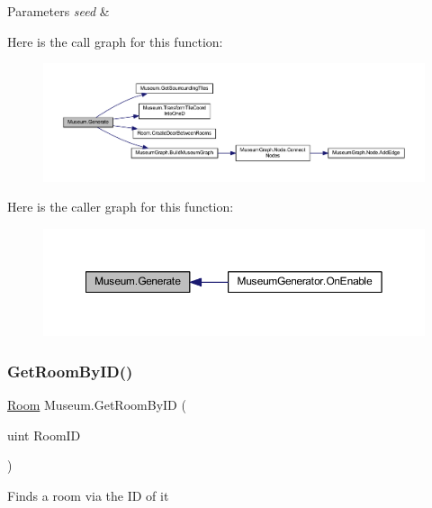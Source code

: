 \begin{DoxyParams}{Parameters}
{\em seed} & \\
\hline
\end{DoxyParams}
Here is the call graph for this function\+:
\nopagebreak
\begin{figure}[H]
\begin{center}
\leavevmode
\includegraphics[width=350pt]{class_museum_a2a301b4e27f35da164ffa03b3d3d7e81_cgraph}
\end{center}
\end{figure}
Here is the caller graph for this function\+:
\nopagebreak
\begin{figure}[H]
\begin{center}
\leavevmode
\includegraphics[width=350pt]{class_museum_a2a301b4e27f35da164ffa03b3d3d7e81_icgraph}
\end{center}
\end{figure}
\mbox{\label{class_museum_a31c3e63a3a1e2edf6e219cb1f04b9515}} 
\subsubsection{\texorpdfstring{Get\+Room\+By\+I\+D()}{GetRoomByID()}}
{\footnotesize\ttfamily \mbox{\hyperlink{class_room}{Room}} Museum.\+Get\+Room\+By\+ID (\begin{DoxyParamCaption}\item[{uint}]{Room\+ID }\end{DoxyParamCaption})}



Finds a room via the ID of it 


